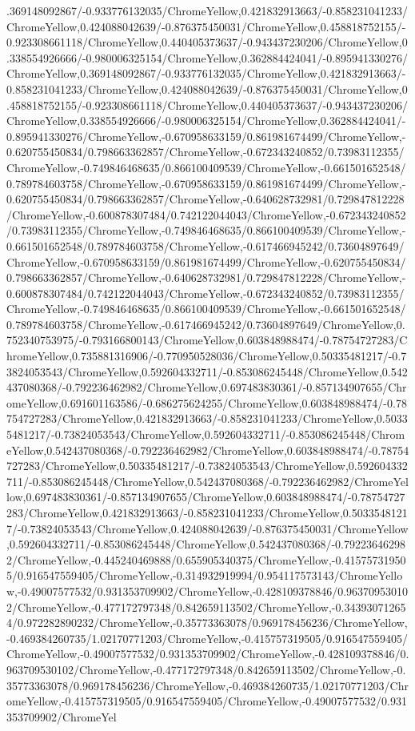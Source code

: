 {\begin{tikzternal}
{.369148092867/-0.933776132035/ChromeYellow,0.421832913663/-0.858231041233/ChromeYellow,0.424088042639/-0.876375450031/ChromeYellow,0.458818752155/-0.923308661118/ChromeYellow,0.440405373637/-0.943437230206/ChromeYellow,0.338554926666/-0.980006325154/ChromeYellow,0.362884424041/-0.895941330276/ChromeYellow,0.369148092867/-0.933776132035/ChromeYellow,0.421832913663/-0.858231041233/ChromeYellow,0.424088042639/-0.876375450031/ChromeYellow,0.458818752155/-0.923308661118/ChromeYellow,0.440405373637/-0.943437230206/ChromeYellow,0.338554926666/-0.980006325154/ChromeYellow,0.362884424041/-0.895941330276/ChromeYellow,-0.670958633159/0.861981674499/ChromeYellow,-0.620755450834/0.798663362857/ChromeYellow,-0.672343240852/0.73983112355/ChromeYellow,-0.749846468635/0.866100409539/ChromeYellow,-0.661501652548/0.789784603758/ChromeYellow,-0.670958633159/0.861981674499/ChromeYellow,-0.620755450834/0.798663362857/ChromeYellow,-0.640628732981/0.729847812228/ChromeYellow,-0.600878307484/0.742122044043/ChromeYellow,-0.672343240852/0.73983112355/ChromeYellow,-0.749846468635/0.866100409539/ChromeYellow,-0.661501652548/0.789784603758/ChromeYellow,-0.617466945242/0.73604897649/ChromeYellow,-0.670958633159/0.861981674499/ChromeYellow,-0.620755450834/0.798663362857/ChromeYellow,-0.640628732981/0.729847812228/ChromeYellow,-0.600878307484/0.742122044043/ChromeYellow,-0.672343240852/0.73983112355/ChromeYellow,-0.749846468635/0.866100409539/ChromeYellow,-0.661501652548/0.789784603758/ChromeYellow,-0.617466945242/0.73604897649/ChromeYellow,0.752340753975/-0.793166800143/ChromeYellow,0.603848988474/-0.78754727283/ChromeYellow,0.735881316906/-0.770950528036/ChromeYellow,0.50335481217/-0.73824053543/ChromeYellow,0.592604332711/-0.853086245448/ChromeYellow,0.542437080368/-0.792236462982/ChromeYellow,0.697483830361/-0.857134907655/ChromeYellow,0.691601163586/-0.686275624255/ChromeYellow,0.603848988474/-0.78754727283/ChromeYellow,0.421832913663/-0.858231041233/ChromeYellow,0.50335481217/-0.73824053543/ChromeYellow,0.592604332711/-0.853086245448/ChromeYellow,0.542437080368/-0.792236462982/ChromeYellow,0.603848988474/-0.78754727283/ChromeYellow,0.50335481217/-0.73824053543/ChromeYellow,0.592604332711/-0.853086245448/ChromeYellow,0.542437080368/-0.792236462982/ChromeYellow,0.697483830361/-0.857134907655/ChromeYellow,0.603848988474/-0.78754727283/ChromeYellow,0.421832913663/-0.858231041233/ChromeYellow,0.50335481217/-0.73824053543/ChromeYellow,0.424088042639/-0.876375450031/ChromeYellow,0.592604332711/-0.853086245448/ChromeYellow,0.542437080368/-0.792236462982/ChromeYellow,-0.445240469888/0.655905340375/ChromeYellow,-0.415757319505/0.916547559405/ChromeYellow,-0.314932919994/0.954117573143/ChromeYellow,-0.49007577532/0.931353709902/ChromeYellow,-0.428109378846/0.963709530102/ChromeYellow,-0.477172797348/0.842659113502/ChromeYellow,-0.343930712654/0.972282890232/ChromeYellow,-0.35773363078/0.969178456236/ChromeYellow,-0.469384260735/1.02170771203/ChromeYellow,-0.415757319505/0.916547559405/ChromeYellow,-0.49007577532/0.931353709902/ChromeYellow,-0.428109378846/0.963709530102/ChromeYellow,-0.477172797348/0.842659113502/ChromeYellow,-0.35773363078/0.969178456236/ChromeYellow,-0.469384260735/1.02170771203/ChromeYellow,-0.415757319505/0.916547559405/ChromeYellow,-0.49007577532/0.931353709902/ChromeYel}
\end{tikzternal}}
